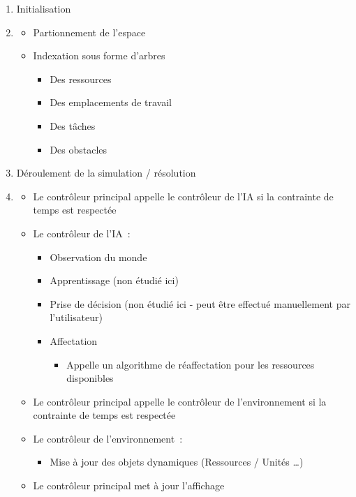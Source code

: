 \begin{enumerate}
\setlength{\itemsep}{8pt}
%
\item Initialisation
\item[]
	\begin{itemize}
	\setlength{\itemsep}{5pt}
	\item Partionnement de l'espace
	\item Indexation sous forme d'arbres %
		\begin{itemize}
		\item Des ressources
		\item Des emplacements de travail
		\item Des tâches
		\item Des obstacles
		\end{itemize}
	\end{itemize}
%
\item Déroulement de la simulation / résolution
\item[]
	\begin{itemize}
	\setlength{\itemsep}{5pt}
	\item Le contrôleur principal appelle le contrôleur de l'IA si la contrainte de temps est respectée
	\item Le contrôleur de l'IA~:
		\begin{itemize}
		\setlength{\itemsep}{2pt}
		\item Observation du monde
		\item Apprentissage (non étudié ici)
		\item Prise de décision (non étudié ici - peut être effectué manuellement par l'utilisateur)
		\item Affectation
			\begin{itemize}
			\item Appelle un algorithme de réaffectation pour les ressources disponibles
			\end{itemize}
		\end{itemize}
	\item Le contrôleur principal appelle le contrôleur de l'environnement si la contrainte de temps est respectée
	\item Le contrôleur de l'environnement~:
		\begin{itemize}
		\item Mise à jour des objets dynamiques (Ressources / Unités \ldots)
		\end{itemize}
	\item Le contrôleur principal met à jour l'affichage

\end{itemize}
\end{enumerate}
